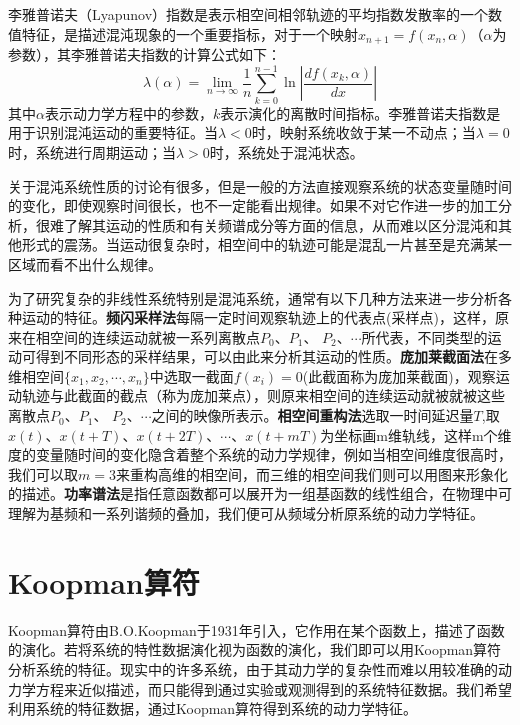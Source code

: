 李雅普诺夫（Lyapunov）指数是表示相空间相邻轨迹的平均指数发散率的一个数值特征，是描述混沌现象的一个重要指标，对于一个映射$x_{n+1}=f(x_n,\alpha)$（$\alpha$为参数），其李雅普诺夫指数的计算公式如下：
\begin{equation}
    \lambda(\alpha)=\lim_{n\to \infty}\dfrac{1}{n}\sum_{k=0}^{n-1}\ln{|\dfrac{df(x_k,\alpha)}{dx}|}
\end{equation}
其中$\alpha$表示动力学方程中的参数，$k$表示演化的离散时间指标。李雅普诺夫指数是用于识别混沌运动的重要特征。当$\lambda<0$时，映射系统收敛于某一不动点；当$\lambda=0$时，系统进行周期运动；当$\lambda>0$时，系统处于混沌状态。

关于混沌系统性质的讨论有很多，但是一般的方法直接观察系统的状态变量随时间的变化，即使观察时间很长，也不一定能看出规律。如果不对它作进一步的加工分析，很难了解其运动的性质和有关频谱成分等方面的信息，从而难以区分混沌和其他形式的震荡。当运动很复杂时，相空间中的轨迹可能是混乱一片甚至是充满某一区域而看不出什么规律。

为了研究复杂的非线性系统特别是混沌系统，通常有以下几种方法来进一步分析各种运动的特征。\textbf{频闪采样法}每隔一定时间观察轨迹上的代表点(采样点)，这样，原来在相空间的连续运动就被一系列离散点$P_0$、$P_1$、
$P_2$、$\cdots$所代表，不同类型的运动可得到不同形态的采样结果，可以由此来分析其运动的性质。\textbf{庞加莱截面法}在多维相空间$\{x_1,x_2,\cdots,x_n\}$中选取一截面$f(x_i)=0$(此截面称为庞加莱截面)，观察运动轨迹与此截面的截点（称为庞加莱点），则原来相空间的连续运动就被就被这些离散点$P_0$、$P_1$、
$P_2$、$\cdots$之间的映像所表示。\textbf{相空间重构法}选取一时间延迟量$T$,取$x(t)$、$x(t+T)$、$x(t+2T)$、$\cdots$、$x(t+mT)$为坐标画m维轨线，这样m个维度的变量随时间的变化隐含着整个系统的动力学规律，例如当相空间维度很高时，我们可以取$m=3$来重构高维的相空间，而三维的相空间我们则可以用图来形象化的描述。\textbf{功率谱法}是指任意函数都可以展开为一组基函数的线性组合，在物理中可理解为基频和一系列谐频的叠加，我们便可从频域分析原系统的动力学特征。



\section{Koopman算符}
Koopman算符由B.O.Koopman于1931年引入，它作用在某个函数上，描述了函数的演化。若将系统的特性数据演化视为函数的演化，我们即可以用Koopman算符分析系统的特征。现实中的许多系统，由于其动力学的复杂性而难以用较准确的动力学方程来近似描述，而只能得到通过实验或观测得到的系统特征数据。我们希望利用系统的特征数据，通过Koopman算符得到系统的动力学特征。

